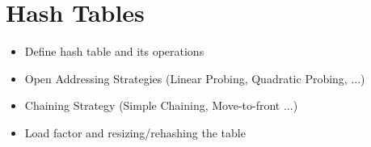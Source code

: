 \chapter{Hash Tables}
\label{cap:Hash Tables}

\begin{itemize}
\item Define hash table and its operations
\item Open Addressing Strategies (Linear Probing, Quadratic Probing, ...)
\item Chaining Strategy (Simple Chaining, Move-to-front ...)
\item Load factor and resizing/rehashing the table
\end{itemize}